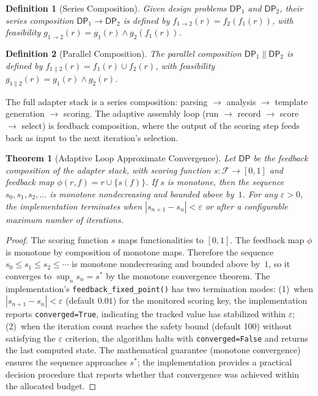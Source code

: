 \documentclass[11pt]{article}
\newtheorem{definition}{Definition}
\newtheorem{theorem}{Theorem}
\begin{document}
\begin{definition}[Series Composition]
Given design problems $\mathsf{DP}_1$ and $\mathsf{DP}_2$, their series
composition $\mathsf{DP}_1 \to \mathsf{DP}_2$ is defined by
$f_{1\to2}(r) = f_2(f_1(r))$, with feasibility
$g_{1\to2}(r) = g_1(r) \wedge g_2(f_1(r))$.
\end{definition}

\begin{definition}[Parallel Composition]
The parallel composition $\mathsf{DP}_1 \| \mathsf{DP}_2$ is defined by
$f_{1\|2}(r) = f_1(r) \cup f_2(r)$, with feasibility
$g_{1\|2}(r) = g_1(r) \wedge g_2(r)$.
\end{definition}

The full adapter stack is a series composition: parsing $\to$ analysis
$\to$ template generation $\to$ scoring.  The adaptive assembly loop
(run $\to$ record $\to$ score $\to$ select) is feedback composition,
where the output of the scoring step feeds back as input to the next
iteration's selection.

\begin{theorem}[Adaptive Loop Approximate Convergence]
Let $\mathsf{DP}$ be the feedback composition of the adapter stack, with
scoring function $s: \mathcal{F} \to [0, 1]$ and feedback map
$\phi(r, f) = r \cup \{s(f)\}$.  If $s$ is monotone, then the sequence
$s_0, s_1, s_2, \ldots$ is monotone nondecreasing and bounded above by~$1$.
For any $\varepsilon > 0$, the implementation terminates when
$|s_{n+1} - s_n| < \varepsilon$ or after a configurable maximum number
of iterations.
\end{theorem}

\begin{proof}
The scoring function $s$ maps functionalities to $[0, 1]$.  The feedback
map $\phi$ is monotone by composition of monotone maps.  Therefore the
sequence $s_0 \leq s_1 \leq s_2 \leq \cdots$ is monotone nondecreasing
and bounded above by~$1$, so it converges to $\sup_n s_n = s^*$ by the
monotone convergence theorem.  The implementation's
\texttt{feedback\_fixed\_point()} has two termination modes:
(1)~when $|s_{n+1} - s_n| < \varepsilon$ (default $0.01$) for the
monitored scoring key, the implementation reports \texttt{converged=True},
indicating the tracked value has stabilized within $\varepsilon$;
(2)~when the iteration count reaches the safety bound (default 100)
without satisfying the $\varepsilon$ criterion, the algorithm halts with
\texttt{converged=False} and returns the last computed state.  The
mathematical guarantee (monotone convergence) ensures the sequence
approaches $s^*$; the implementation provides a practical decision
procedure that reports whether that convergence was achieved within
the allocated budget.
\end{proof}
\end{document}

